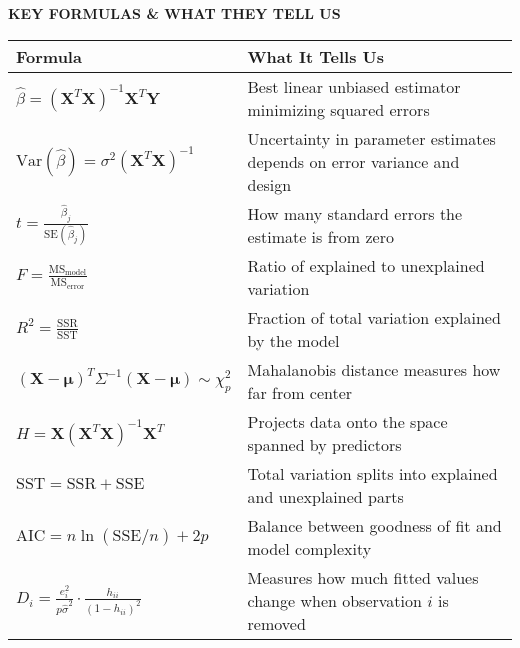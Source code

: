 \documentclass[10pt]{article}
\newcommand{\vect}[1]{\symbf{#1}} %
\begin{document}
\begin{center}
  \textbf{KEY FORMULAS \& WHAT THEY TELL US}
\end{center}
\begin{center}
  \scriptsize
  \begin{tabular}{l p{8cm}}
    \toprule
    \textbf{Formula}                                                            & \textbf{What It Tells Us}                                               \\
    \midrule
    $\hat{\beta} = (\vect{X}^T\vect{X})^{-1}\vect{X}^T\vect{Y}$                 & Best linear unbiased estimator minimizing squared errors                \\
    $\text{Var}(\hat{\beta}) = \sigma^2(\vect{X}^T\vect{X})^{-1}$               & Uncertainty in parameter estimates depends on error variance and design \\
    $t = \frac{\hat{\beta}_j}{\text{SE}(\hat{\beta}_j)}$                        & How many standard errors the estimate is from zero                      \\
    $F = \frac{\text{MS}_{\text{model}}}{\text{MS}_{\text{error}}}$             & Ratio of explained to unexplained variation                             \\
    $R^2 = \frac{\text{SSR}}{\text{SST}}$                                       & Fraction of total variation explained by the model                      \\
    $(\vect{X} - \vect{\mu})^T\Sigma^{-1}(\vect{X} - \vect{\mu}) \sim \chi^2_p$ & Mahalanobis distance measures how far from center                       \\
    $H = \vect{X}(\vect{X}^T\vect{X})^{-1}\vect{X}^T$                           & Projects data onto the space spanned by predictors                      \\
    $\text{SST} = \text{SSR} + \text{SSE}$                                      & Total variation splits into explained and unexplained parts             \\
    $\text{AIC} = n\ln(\text{SSE}/n) + 2p$                                      & Balance between goodness of fit and model complexity                    \\
    $D_i = \frac{e_i^2}{p\hat{\sigma}^2} \cdot \frac{h_{ii}}{(1-h_{ii})^2}$     & Measures how much fitted values change when observation $i$ is removed  \\
    \bottomrule
  \end{tabular}
\end{center}
\end{document}
